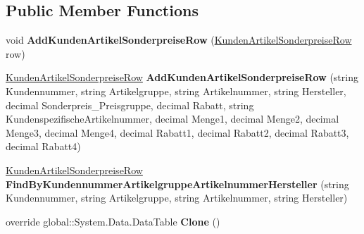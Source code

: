 \subsection*{Public Member Functions}
\begin{DoxyCompactItemize}
\item 
void {\bfseries Add\+Kunden\+Artikel\+Sonderpreise\+Row} (\hyperlink{class_products_1_1_data_1_1ds_sage_1_1_kunden_artikel_sonderpreise_row}{Kunden\+Artikel\+Sonderpreise\+Row} row)\hypertarget{class_products_1_1_data_1_1ds_sage_1_1_kunden_artikel_sonderpreise_data_table_a0e783e9c71ae269b151f408acefe916f}{}\label{class_products_1_1_data_1_1ds_sage_1_1_kunden_artikel_sonderpreise_data_table_a0e783e9c71ae269b151f408acefe916f}

\item 
\hyperlink{class_products_1_1_data_1_1ds_sage_1_1_kunden_artikel_sonderpreise_row}{Kunden\+Artikel\+Sonderpreise\+Row} {\bfseries Add\+Kunden\+Artikel\+Sonderpreise\+Row} (string Kundennummer, string Artikelgruppe, string Artikelnummer, string Hersteller, decimal Sonderpreis\+\_\+\+Preisgruppe, decimal Rabatt, string Kundenspezifische\+Artikelnummer, decimal Menge1, decimal Menge2, decimal Menge3, decimal Menge4, decimal Rabatt1, decimal Rabatt2, decimal Rabatt3, decimal Rabatt4)\hypertarget{class_products_1_1_data_1_1ds_sage_1_1_kunden_artikel_sonderpreise_data_table_a35defed9511b4d63ed90cda867d12a70}{}\label{class_products_1_1_data_1_1ds_sage_1_1_kunden_artikel_sonderpreise_data_table_a35defed9511b4d63ed90cda867d12a70}

\item 
\hyperlink{class_products_1_1_data_1_1ds_sage_1_1_kunden_artikel_sonderpreise_row}{Kunden\+Artikel\+Sonderpreise\+Row} {\bfseries Find\+By\+Kundennummer\+Artikelgruppe\+Artikelnummer\+Hersteller} (string Kundennummer, string Artikelgruppe, string Artikelnummer, string Hersteller)\hypertarget{class_products_1_1_data_1_1ds_sage_1_1_kunden_artikel_sonderpreise_data_table_a2449f0a390266ef7a95d292eec868c23}{}\label{class_products_1_1_data_1_1ds_sage_1_1_kunden_artikel_sonderpreise_data_table_a2449f0a390266ef7a95d292eec868c23}

\item 
override global\+::\+System.\+Data.\+Data\+Table {\bfseries Clone} ()\hypertarget{class_products_1_1_data_1_1ds_sage_1_1_kunden_artikel_sonderpreise_data_table_add8641e1a3fc4ddf308210171b14555b}{}\label{class_products_1_1_data_1_1ds_sage_1_1_kunden_artikel_sonderpreise_data_table_add8641e1a3fc4ddf308210171b14555b}


\end{DoxyCompactItemize}

